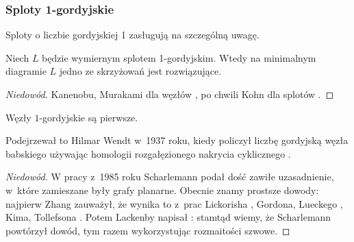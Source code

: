 
\subsubsection{Sploty 1-gordyjskie}
Sploty o liczbie gordyjskiej 1 zasługują na szczególną uwagę.

\begin{proposition}
%
    Niech $L$ będzie wymiernym splotem 1-gordyjskim.
    Wtedy na minimalnym diagramie $L$ jedno ze skrzyżowań jest rozwiązujące.
\end{proposition}

\begin{proof}[Niedowód]
%
%
%
    Kanenobu, Murakami dla węzłów \cite{kanenobumurakami1986}, po chwili Kohn dla splotów \cite{kohn1991}.
\end{proof}

\begin{proposition}
\label{prp:unknotting_one_prime}%
    Węzły $1$-gordyjskie są pierwsze.
\end{proposition}

Podejrzewał to Hilmar Wendt w~1937 roku, kiedy policzył liczbę gordyjską węzła babskiego używając homologii rozgałęzionego nakrycia cyklicznego \cite{wendt1937}.
%

\begin{proof}[Niedowód]
    W pracy \cite{scharlemann1985} z~1985 roku Scharlemann podał dość zawiłe uzasadnienie, w~które zamieszane były grafy planarne.
%
    Obecnie znamy prostsze dowody: najpierw Zhang \cite{zhang1991} zauważył, że wynika to z~prac Lickorisha \cite{lickorish1985}, Gordona, Lueckego \cite{luecke1987}, Kima, Tollefsona \cite{tollefson1980}.
%
%
%
%
%
%
    Potem Lackenby napisał \cite{lackenby1997}: stamtąd wiemy, że Scharlemann powtórzył dowód, tym razem wykorzystując rozmaitości szwowe.
%
%
\end{proof}


